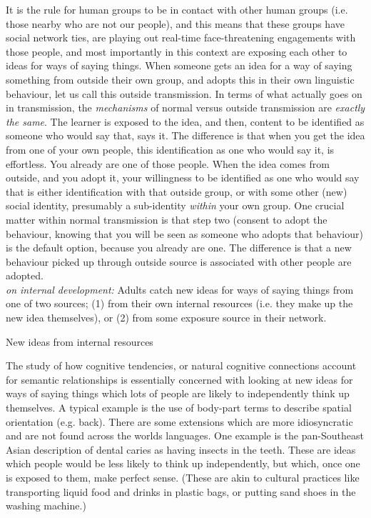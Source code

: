 It is the rule for human groups to be in contact with other human groups (i.e. those nearby who are not our people), and this means that these groups have social network ties, are playing out real-time face-threatening engagements with those people, and most importantly in this context are exposing each other to ideas for ways of saying things. When someone gets an idea for a way of saying something from outside their own group, and adopts this in their own linguistic behaviour, let us call this outside transmission. In terms of what actually goes on in transmission, the \textit{mechanisms }of normal versus outside transmission are \textit{exactly the same}. The learner is exposed to the idea, and then, content to be identified as someone who would say that, says it. The difference is that when you get the idea from one of your own people, this identification as one who would say it, is effortless. You already are one of those people. When the idea comes from outside, and you adopt it, your willingness to be identified as one who would say that is either identification with that outside group, or with some other (new) social identity, presumably a sub-identity \textit{within }your own group. One crucial matter within normal transmission is that step two (consent to adopt the behaviour, knowing that you will be seen as someone who adopts that behaviour) is the default option, because you already are one. The difference is that a new behaviour picked up through outside source is associated with other people are adopted.
\\
\textit{on internal development:}
Adults catch new ideas for ways of saying things from one of two sources; (1) from their own internal resources (i.e. they make up the new idea themselves), or (2) from some exposure source in their network.
			
New ideas from internal resources

	The study of how cognitive tendencies, or natural cognitive connections account for semantic relationships is essentially concerned with looking at new ideas for ways of saying things which lots of people are likely to independently think up themselves. A typical example is the use of body-part terms to describe spatial orientation (e.g. back). 
	There are some extensions which are more idiosyncratic and are not found across the worlds languages. One example is the pan-Southeast Asian description of dental caries as having insects in the teeth. These are ideas which people would be less likely to think up independently, but which, once one is exposed to them, make perfect sense. (These are akin to cultural practices like transporting liquid food and drinks in plastic bags, or putting sand shoes in the washing machine.)

